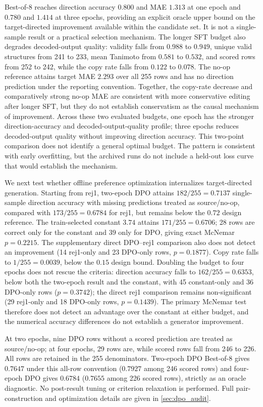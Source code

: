 \documentclass[11pt]{article}
\begin{document}
Best-of-8 reaches direction accuracy $0.800$ and MAE $1.313$ at one epoch and $0.780$ and $1.414$ at three epochs, providing an explicit oracle upper bound on the target-directed improvement available within the candidate set. It is not a single-sample result or a practical selection mechanism. The longer SFT budget also degrades decoded-output quality: validity falls from $0.988$ to $0.949$, unique valid structures from 241 to 233, mean Tanimoto from $0.581$ to $0.532$, and scored rows from 252 to 242, while the copy rate falls from $0.122$ to $0.078$. The no-op reference attains target MAE $2.293$ over all 255 rows and has no direction prediction under the reporting convention. Together, the copy-rate decrease and comparatively strong no-op MAE are consistent with more conservative editing after longer SFT, but they do not establish conservatism as the causal mechanism of improvement. Across these two evaluated budgets, one epoch has the stronger direction-accuracy and decoded-output-quality profile; three epochs reduces decoded-output quality without improving direction accuracy. This two-point comparison does not identify a general optimal budget. The pattern is consistent with early overfitting, but the archived runs do not include a held-out loss curve that would establish the mechanism.

We next test whether offline preference optimization internalizes target-directed generation. Starting from rej1, two-epoch DPO attains $182/255=0.7137$ single-sample direction accuracy with missing predictions treated as source/no-op, compared with $173/255=0.6784$ for rej1, but remains below the $0.72$ design reference. The train-selected constant $3.74$ attains $171/255=0.6706$; 28 rows are correct only for the constant and 39 only for DPO, giving exact McNemar $p=0.2215$. The supplementary direct DPO--rej1 comparison also does not detect an improvement (14 rej1-only and 23 DPO-only rows, $p=0.1877$). Copy rate falls to $1/255=0.0039$, below the $0.15$ design bound. Doubling the budget to four epochs does not rescue the criteria: direction accuracy falls to $162/255=0.6353$, below both the two-epoch result and the constant, with 45 constant-only and 36 DPO-only rows ($p=0.3742$); the direct rej1 comparison remains non-significant (29 rej1-only and 18 DPO-only rows, $p=0.1439$). The primary McNemar test therefore does not detect an advantage over the constant at either budget, and the numerical accuracy differences do not establish a generator improvement.

At two epochs, nine DPO rows without a scored prediction are treated as source/no-op; at four epochs, 29 rows are, while scored rows fall from 246 to 226. All rows are retained in the 255 denominators. Two-epoch DPO Best-of-8 gives $0.7647$ under this all-row convention ($0.7927$ among 246 scored rows) and four-epoch DPO gives $0.6784$ ($0.7655$ among 226 scored rows), strictly as an oracle diagnostic. No post-result tuning or criterion relaxation is performed. Full pair-construction and optimization details are given in \cref{sec:dpo_audit}.
\end{document}
